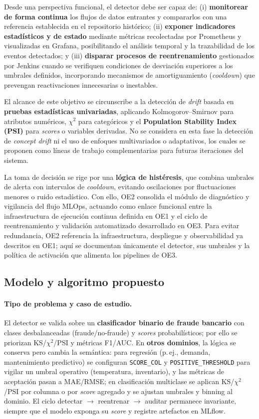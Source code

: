 Desde una perspectiva funcional, el detector debe ser capaz de:  
(i) \textbf{monitorear de forma continua} los flujos de datos entrantes y compararlos con una referencia establecida en el repositorio histórico;  
(ii) \textbf{exponer indicadores estadísticos y de estado} mediante métricas recolectadas por Prometheus y visualizadas en Grafana, posibilitando el análisis temporal y la trazabilidad de los eventos detectados; y  
(iii) \textbf{disparar procesos de reentrenamiento} gestionados por Jenkins cuando se verifiquen condiciones de desviación superiores a los umbrales definidos, incorporando mecanismos de amortiguamiento (\textit{cooldown}) que prevengan reactivaciones innecesarias o inestables.

El alcance de este objetivo se circunscribe a la detección de \textit{drift} basada en \textbf{pruebas estadísticas univariadas}, aplicando Kolmogorov–Smirnov para atributos numéricos, $\chi^2$ para categóricos y el \textbf{Population Stability Index (PSI)} para \textit{scores} o variables derivadas.  
No se considera en esta fase la detección de \textit{concept drift} ni el uso de enfoques multivariados o adaptativos, los cuales se proponen como líneas de trabajo complementarias para futuras iteraciones del sistema.

La toma de decisión se rige por una \textbf{lógica de histéresis}, que combina umbrales de alerta con intervalos de \textit{cooldown}, evitando oscilaciones por fluctuaciones menores o ruido estadístico.  
Con ello, OE2 consolida el módulo de diagnóstico y vigilancia del flujo MLOps, actuando como enlace funcional entre la infraestructura de ejecución continua definida en OE1 y el ciclo de reentrenamiento y validación automatizado desarrollado en OE3.
Para evitar redundancia, OE2 referencia la infraestructura, despliegue y observabilidad ya descritos en OE1; aquí se documentan únicamente el detector, sus umbrales y la política de activación que alimenta los pipelines de OE3.

\subsection{Modelo y algoritmo propuesto}

\paragraph{Tipo de problema y caso de estudio.}
El detector se valida sobre un \textbf{clasificador binario de fraude bancario} con clases desbalanceadas (fraude/no-fraude) y \textit{scores} probabilísticos; por ello se priorizan KS/$\chi^2$/PSI y métricas F1/AUC. En \textbf{otros dominios}, la lógica se conserva pero cambia la semántica: para regresión (p.\,ej., demanda, mantenimiento predictivo) se configuran \texttt{SCORE\_COL} y \texttt{POSITIVE\_THRESHOLD} para vigilar un umbral operativo (temperatura, inventario), y las métricas de aceptación pasan a MAE/RMSE; en clasificación multiclase se aplican KS/$\chi^2$/PSI por columna o por \textit{score} agregado y se ajustan umbrales y binning al dominio. El ciclo detectar $\rightarrow$ reentrenar $\rightarrow$ auditar permanece invariante, siempre que el modelo exponga su \textit{score} y registre artefactos en MLflow.

